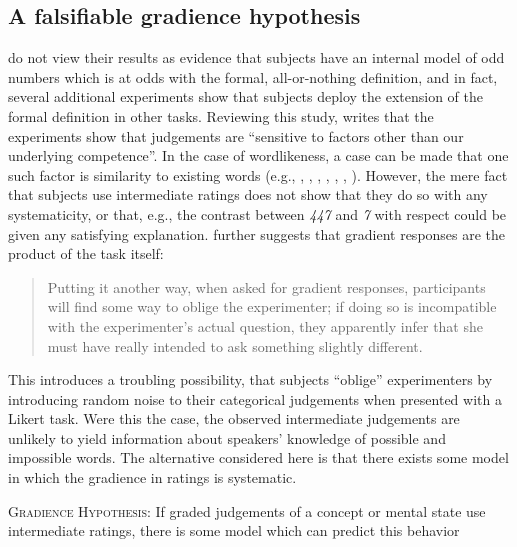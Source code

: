 \subsection{A falsifiable gradience hypothesis}

\citeauthor{Armstrong1983} do not view their results as evidence that subjects have an internal model of odd numbers which is at odds with the formal, all-or-nothing definition, and in fact, several additional experiments show that subjects deploy the extension of the formal definition in other tasks. Reviewing this study, \citet[215]{Schutze2011} writes that the experiments show that judgements are ``sensitive to factors other than our underlying competence''. In the case of wordlikeness, a case can be made that one such factor is similarity to existing words (e.g., \citealt{Bailey2001}, \citealt[][151, fn. 27]{LSLT}, \citealt{Greenberg1964}, \citealt{Ohala1986b}, \citealt{Schutze2005}, \citealt{Sendlmeier1987}, \citealt{Vitz1973}). However, the mere fact that subjects use intermediate ratings does not show that they do so with any systematicity, or that, e.g., the contrast between \emph{447} and \emph{7} with respect could be given any satisfying explanation. \citeauthor{Schutze2011} further suggests that gradient responses are the product of the task itself:

\begin{quote}
Putting it another way, when asked for gradient responses, participants will find some way to oblige the experimenter; if doing so is incompatible with the experimenter's actual question, they apparently infer that she must have really intended to ask something slightly different. \citep[215]{Schutze2011}
\end{quote}

This introduces a troubling possibility, that subjects ``oblige'' experimenters by introducing random noise to their categorical judgements when presented with a Likert task. Were this the case, the observed intermediate judgements are unlikely to yield information about speakers' knowledge of possible and impossible words. The alternative considered here is that there exists some model in which the gradience in ratings is systematic. 

\begin{unlabeledexample}
\textsc{Gradience Hypothesis}: If graded judgements of a concept or mental state use intermediate ratings, there is some model which can predict this behavior
\end{unlabeledexample}

